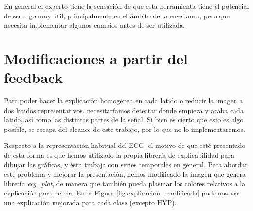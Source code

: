 En general el experto tiene la sensación de que esta herramienta tiene el potencial de ser algo muy útil, principalmente en el ámbito de la enseñanza, pero que necesita implementar algunos cambios antes de ser utilizada.

\section{Modificaciones a partir del feedback}
Para poder hacer la explicación homogénea en cada latido o reducir la imagen a dos latidos representativos, necesitaríamos detectar donde empieza y acaba cada latido, así como las distintas partes de la señal. Si bien es cierto que esto es algo posible, se escapa del alcance de este trabajo, por lo que no lo implementaremos.

Respecto a la representación habitual del ECG, el motivo de que esté presentado de esta forma es que hemos utilizado la propia librería de explicabilidad para dibujar las gráficas, y ésta trabaja con series temporales en general. Para abordar este problema y mejorar la presentación, hemos modificado la imagen que genera librería \emph{ecg\_plot}, de manera que también pueda plasmar los colores relativos a la explicación por encima. En la Figura \ref{fig:explicacion_modificada} podemos ver una explicación mejorada para cada clase (excepto HYP).

